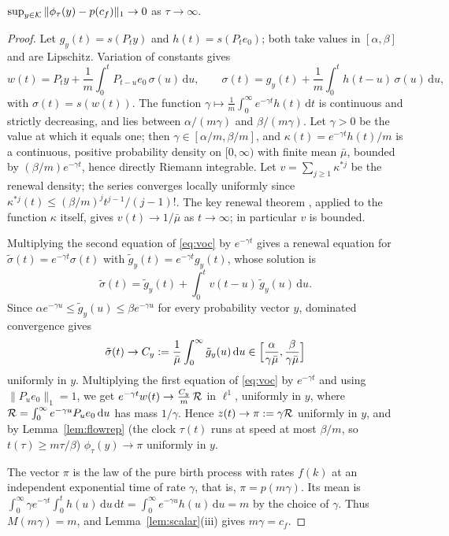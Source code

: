 \begin{proposition}\label{prop:attract}
$\sup_{y\in\mathcal{K}}\|\phi_\tau(y)-p(c_f)\|_1\to0$ as $\tau\to\infty$.
\end{proposition}

\begin{proof}
Let $g_y(t)=s(P_ty)$ and $h(t)=s(P_te_0)$; both take values in $[\alpha,\beta]$ and are Lipschitz. Variation of
constants gives
\begin{equation}\label{eq:voc}
  w(t)=P_ty+\frac1m\int_0^tP_{t-u}e_0\,\sigma(u)\,\mathrm du,\qquad
  \sigma(t)=g_y(t)+\frac1m\int_0^th(t-u)\,\sigma(u)\,\mathrm du,
\end{equation}
with $\sigma(t)=s(w(t))$. The function $\gamma\mapsto\frac1m\int_0^\infty e^{-\gamma t}h(t)\,\mathrm dt$ is
continuous and strictly decreasing, and lies between $\alpha/(m\gamma)$ and $\beta/(m\gamma)$. Let $\gamma>0$ be
the value at which it equals one; then $\gamma\in[\alpha/m,\beta/m]$, and
$\kappa(t)=e^{-\gamma t}h(t)/m$ is a continuous, positive probability density on $[0,\infty)$ with finite mean
$\bar\mu$, bounded by $(\beta/m)e^{-\gamma t}$, hence directly Riemann integrable. Let
$v=\sum_{j\ge1}\kappa^{*j}$ be the renewal density; the series converges locally uniformly since
$\kappa^{*j}(t)\le(\beta/m)^jt^{j-1}/(j-1)!$. The key renewal theorem \cite[Chapter~XI]{Feller}, applied to the
function $\kappa$ itself, gives $v(t)\to1/\bar\mu$ as $t\to\infty$; in particular $v$ is bounded.

Multiplying the second equation of \eqref{eq:voc} by $e^{-\gamma t}$ gives a renewal equation for
$\tilde\sigma(t)=e^{-\gamma t}\sigma(t)$ with $\tilde g_y(t)=e^{-\gamma t}g_y(t)$, whose solution is
\[
   \tilde\sigma(t)=\tilde g_y(t)+\int_0^tv(t-u)\,\tilde g_y(u)\,\mathrm du .
\]
Since $\alpha e^{-\gamma u}\le\tilde g_y(u)\le\beta e^{-\gamma u}$ for every probability vector $y$, dominated
convergence gives
\[
   \tilde\sigma(t)\to C_y:=\frac1{\bar\mu}\int_0^\infty\tilde g_y(u)\,\mathrm du\in
   \Bigl[\frac{\alpha}{\gamma\bar\mu},\frac{\beta}{\gamma\bar\mu}\Bigr]
\]
uniformly in $y$. Multiplying the first equation of \eqref{eq:voc} by $e^{-\gamma t}$ and using
$\|P_ue_0\|_1=1$, we get $e^{-\gamma t}w(t)\to\frac{C_y}{m}\,\mathcal{R}$ in $\ell^1$, uniformly in $y$, where
$\mathcal{R}=\int_0^\infty e^{-\gamma u}P_ue_0\,\mathrm du$ has mass $1/\gamma$. Hence $z(t)\to\pi:=\gamma\mathcal{R}$ uniformly
in $y$, and by Lemma~\ref{lem:flowrep} (the clock $\tau(t)$ runs at speed at most $\beta/m$, so $t(\tau)\ge m\tau/\beta$)
$\phi_\tau(y)\to\pi$ uniformly in $y$.

The vector $\pi$ is the law of the pure birth process with rates $f(k)$ at an independent exponential time of
rate $\gamma$, that is, $\pi=p(m\gamma)$. Its mean is
$\int_0^\infty\gamma e^{-\gamma t}\int_0^th(u)\,\mathrm du\,\mathrm dt=\int_0^\infty e^{-\gamma u}h(u)\,\mathrm du=m$
by the choice of $\gamma$. Thus $M(m\gamma)=m$, and Lemma~\ref{lem:scalar}(iii) gives $m\gamma=c_f$.
\end{proof}

